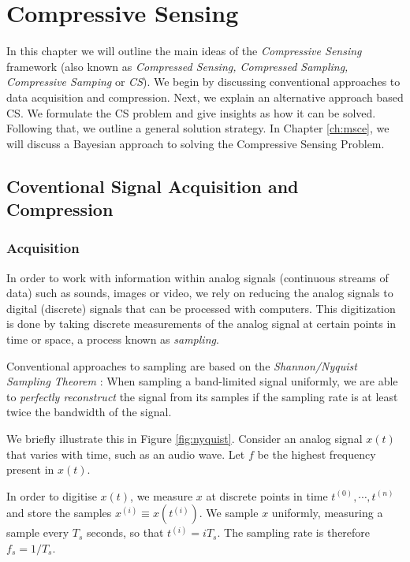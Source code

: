\chapter{Compressive Sensing}
\label{ch:cs}
In this chapter we will outline the main ideas of the \emph{Compressive Sensing} framework (also known as \emph{Compressed Sensing, Compressed Sampling, Compressive Samping} or \emph{CS}).
We begin by discussing conventional approaches to data acquisition and compression.
Next, we explain an alternative approach based CS. 
We formulate the CS problem and give insights as how it can be solved.
Following that, we outline a general solution strategy.
In Chapter \ref{ch:msce}, we will discuss a Bayesian approach to solving the Compressive Sensing Problem.

\section{Coventional Signal Acquisition and Compression}
\subsection{Acquisition}
In order to work with information within analog signals (continuous streams of data) such as sounds, images or video, we rely on reducing the analog signals to digital (discrete) signals that can be processed with computers.
This digitization is done by taking discrete measurements of the analog signal at certain points in time or space, a process known as \emph{sampling}.

Conventional approaches to sampling are based on the \emph{Shannon/Nyquist Sampling Theorem} \cite{shannon1949}:
When sampling a band-limited signal uniformly, we are able to \emph{perfectly reconstruct} the signal from its samples if the sampling rate is at least twice the bandwidth of the signal.

We briefly illustrate this in Figure \ref{fig:nyquist}.
Consider an analog signal $x(t)$ that varies with time, such as an audio wave.
Let $f$ be the highest frequency present in $x(t)$.

In order to digitise $x(t)$, we measure $x$ at discrete points in time $t^{(0)}, \cdots, t^{(n)}$ and store the samples $x^{(i)} \equiv x(t^{(i)})$.
We sample $x$ uniformly, measuring a sample every $T_s$ seconds, so that $t^{(i)} = iT_s$.
The sampling rate is therefore $f_s = 1/T_s$.


